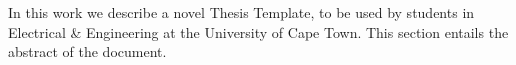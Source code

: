 {}

In this work we describe a novel Thesis Template, to be used by students in Electrical \& Engineering at the University of Cape Town. This section entails the abstract of the document. 

%
%
%
